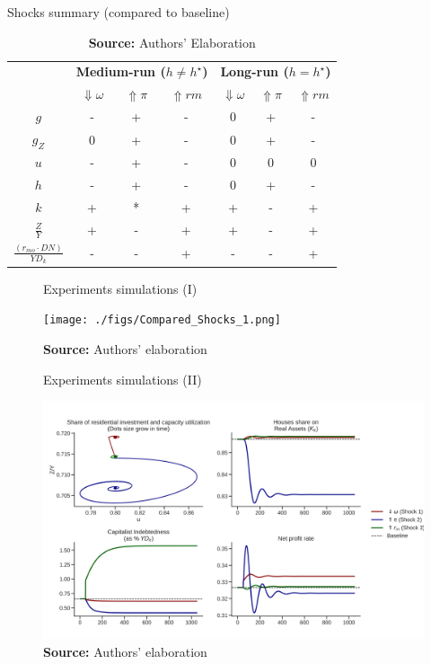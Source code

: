 \documentclass[11pt]{article}
\begin{document}
\begin{table}[H]
	\centering
	\caption{Shocks summary (compared to baseline)}
	\label{ResumoChoques}
		\begin{tabular}{c|c|c|c||c|c|c}
			\hline\hline
			\multirow{2}{*}{} & \multicolumn{3}{c||}{\textbf{Medium-run ($h \neq h^\star$)}} & \multicolumn{3}{c}{\textbf{Long-run ($h = h^\star$)}} \\ \cline{2-7} 
			&  \textbf{$\Downarrow \omega$} & \textbf{$\Uparrow \pi$} & \textbf{$\Uparrow rm$} &  \textbf{$\Downarrow \omega$} & \textbf{$\Uparrow \pi$} & \textbf{$\Uparrow rm$} \\ \hline
			\textbf{$g$}  & - & + & - & 0 & + & - \\ \hline
			\textbf{$g_Z$}  & 0 & + & -  & 0 & + & - \\ \hline
			\textbf{$u$}  & - & + & -  & 0 & 0 & 0 \\ \hline
			\textbf{$h$}  & - & + & -  & 0 & + & - \\ \hline
			\textbf{$k$}  & + & * & +  & + & - & + \\ \hline
			\textbf{$\frac{Z}{Y}$}  & + & - & +  & + & - & + \\ \hline
			\textit{$\frac{(r_{mo}\cdot DN)}{YD_k}$}  & - & - & +  & - & - & + \\ \hline\hline
		\end{tabular}%
	\caption*{\textbf{Source:} Authors' Elaboration}
\end{table}



\begin{figure}[htb]
	\centering
	\caption{Experiments simulations (I)}
	\label{fig:results_1}
	\texttt{[image: ./figs/Compared\_Shocks\_1.png]}
	\caption*{\textbf{Source:} Authors' elaboration}
\end{figure}


\begin{figure}[htb]
	\centering
	\caption{Experiments simulations (II)}
	\label{fig:results_2}
	\includegraphics[width=.8\textwidth]{./figs/Compared_Shocks_2.png}
	\caption*{\textbf{Source:} Authors' elaboration}
\end{figure}
\end{document}
